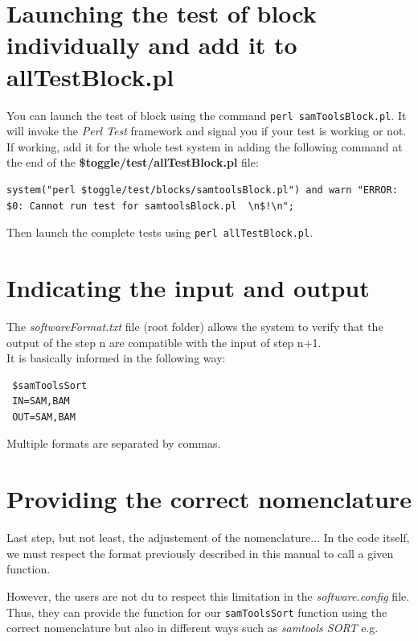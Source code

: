 \documentclass[a4paper,10pt]{report}
\begin{document}
\section{Launching the test of block individually and add it to allTestBlock.pl}

You can launch the test of block using the command \texttt{perl samToolsBlock.pl}. It will invoke the \textit{Perl Test} framework and signal you if your test is working or not. \\

If working, add it for the whole test system in adding the following command at the end of the \textbf{\$toggle/test/allTestBlock.pl} file:

\begin{lstlisting}
system("perl $toggle/test/blocks/samtoolsBlock.pl") and warn "ERROR: $0: Cannot run test for samtoolsBlock.pl  \n$!\n";
\end{lstlisting}

Then launch the complete tests using \texttt{perl allTestBlock.pl}.



\section{Indicating the input and output}

The \emph{softwareFormat.txt} file (root folder) allows the system to verify that the output of the step n are compatible with the input of step n+1.\\

\noindent It is basically informed in the following way:

\begin{verbatim}
 $samToolsSort
 IN=SAM,BAM
 OUT=SAM,BAM
\end{verbatim}

\noindent Multiple formats are separated by commas.

\section{Providing the correct nomenclature}

Last step, but not least, the adjustement of the nomenclature... In the code itself, we must respect the format previously described in this manual to call a given function.

However, the users are not du to respect this limitation in the \emph{software.config} file. Thus, they can provide the function for our \texttt{samToolsSort} function using the correct nomenclature but also in different ways such as \textit{samtools SORT} e.g.
\end{document}
